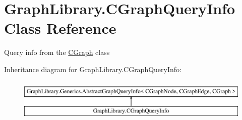 \hypertarget{class_graph_library_1_1_c_graph_query_info}{}\section{Graph\+Library.\+C\+Graph\+Query\+Info Class Reference}
\label{class_graph_library_1_1_c_graph_query_info}


Query info from the \hyperlink{class_graph_library_1_1_c_graph}{C\+Graph} class  


Inheritance diagram for Graph\+Library.\+C\+Graph\+Query\+Info\+:\begin{figure}[H]
\begin{center}
\leavevmode
\includegraphics[height=2.000000cm]{class_graph_library_1_1_c_graph_query_info}
\end{center}
\end{figure}
